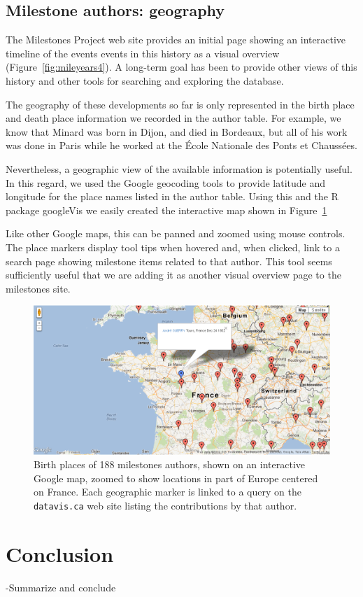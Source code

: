 \documentclass[11pt]{article}
\newcommand*{\figref}[1]{Figure~\ref{#1}}
\begin{document}
\subsection{Milestone authors: geography}\label{sec:geography}
The Milestones Project web site provides an initial page showing an interactive timeline
of the events events in this history as a visual overview (\figref{fig:mileyears4}).
A long-term goal has been to
provide other views of this history and other tools for searching and exploring the
database.

The geography of these developments so far is only represented in the birth place
and death place information we recorded in the author table.
For example, we know that Minard was born in Dijon, and died in Bordeaux, but
all of his work was done in Paris while he worked at the
{\'E}cole Nationale des Ponts et Chauss{\'e}es.

Nevertheless, a geographic view of the available information is potentially useful.
In this regard, we used the Google geocoding tools to provide latitude and
longitude for the place names listed in the author table.  Using this and the
R package googleVis \citep{googleVis} we easily created the interactive map shown
in \figref{fig:authormap}

Like other Google maps, this can be panned and zoomed using mouse controls.
The place markers display tool tips when hovered and, when clicked, link to
a search page showing milestone items related to that author.
This tool seems sufficiently useful that we are adding it as another visual
overview page to the milestones site.


\begin{figure}[!htb]
  \centering
  \includegraphics[width=\textwidth,clip]{fig/authormap}
  \caption{Birth places of 188 milestones authors, shown on an interactive Google map, zoomed to show locations
  in part of Europe centered on France. Each geographic marker is linked to a query on
  the \texttt{datavis.ca} web site listing the contributions by that author.
  }
  \label{fig:authormap}
\end{figure}



\section{Conclusion}
-Summarize and conclude


\end{document}

